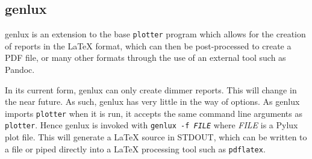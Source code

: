 \documentclass[a4paper]{article}
\begin{document}
\subsection{genlux}
genlux is an extension to the base \texttt{plotter} program which allows for 
the creation of reports in the \LaTeX{} format, which can then be 
post-processed to create a PDF file, or many other formats through the use of 
an external tool such as Pandoc.

In its current form, genlux can only create dimmer reports. This will change 
in the near future. As such, genlux has very little in the way of options. As 
genlux imports \texttt{plotter} when it is run, it accepts the same command 
line arguments as \texttt{plotter}. Hence genlux is invoked with 
\texttt{genlux -f \textit{FILE}} where \textit{FILE} is a Pylux plot file.
This will generate a \LaTeX{} source in STDOUT, which can be written to a 
file or piped directly into a \LaTeX{} processing tool such as 
\texttt{pdflatex}.
\end{document}
